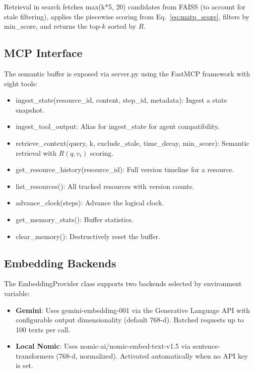 \documentclass[lettersize,journal]{IEEEtran}
\begin{document}
Retrieval in search fetches max(k*5, 20) candidates from FAISS (to account for stale filtering), applies the piecewise scoring from Eq.~\eqref{eq:matp_score}, filters by min\_score, and returns the top-$k$ sorted by $R$.

\subsection{MCP Interface}

The semantic buffer is exposed via server.py using the FastMCP framework with eight tools:

\begin{itemize}
    \item ingest\_state(resource\_id, content, step\_id, metadata): Ingest a state snapshot.
    \item ingest\_tool\_output: Alias for ingest\_state for agent compatibility.
    \item retrieve\_context(query, k, exclude\_stale, time\_decay, min\_score): Semantic retrieval with $R(q, v_i)$ scoring.
    \item get\_resource\_history(resource\_id): Full version timeline for a resource.
    \item list\_resources(): All tracked resources with version counts.
    \item advance\_clock(steps): Advance the logical clock.
    \item get\_memory\_stats(): Buffer statistics.
    \item clear\_memory(): Destructively reset the buffer.
\end{itemize}

\subsection{Embedding Backends}

The EmbeddingProvider class supports two backends selected by environment variable:

\begin{itemize}
    \item \textbf{Gemini}: Uses gemini-embedding-001 via the Generative Language API with configurable output dimensionality (default 768-d). Batched requests up to 100 texts per call.
    \item \textbf{Local Nomic}: Uses nomic-ai/nomic-embed-text-v1.5 via sentence-transformers (768-d, normalized). Activated automatically when no API key is set.
\end{itemize}
\end{document}
